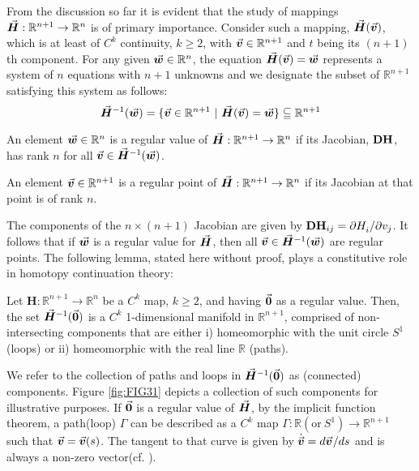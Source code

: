 From the discussion so far it is evident that the study of mappings
$\vec{\bm{H}}:\mathbb{R}^{n+1}\rightarrow\mathbb{R}^n$ is of primary importance. 
Consider such a mapping, $\vec{\bm{H}}(\vec{\bm{v}})$, which is at least 
of $C^k$ continuity, $k\geq 2$, with $\vec{\bm{v}}\in\mathbb{R}^{n+1}$ and $t$ 
being its $(n+1)$th component. 
For any given $\vec{\bm{w}}\in\mathbb{R}^n$, the equation 
$\vec{\bm{H}}(\vec{\bm{v}})=\vec{\bm{w}}$
represents a system of $n$ equations with $n+1$ unknowns and we designate the
subset of $\mathbb{R}^{n+1}$ satisfying this system as follows:
\begin{equation*}
	\bvec{H}^{-1}(\bvec{w}) = \{\bvec{v}\in\mathbb{R}^{n+1}\ |\ 
	\bvec{H}(\bvec{v})=\bvec{w}\}\subseteqq\mathbb{R}^{n+1}
\end{equation*}
\begin{definition}
	An element $\vec{\bm{w}}\in\mathbb{R}^n$ is a regular value of 
	$\vec{\bm{H}}:\mathbb{R}^{n+1}\rightarrow\mathbb{R}^n$ if its Jacobian,
	$\mathbf{DH}$, has rank $n$ for all $\vec{\bm{v}}\in \vec{\bm{H}}^{-1}(\vec{\bm{w}})$.
	\label{def:reg}
\end{definition}
\begin{definition}
	An element $\vec{\bm{v}}\in\mathbb{R}^{n+1}$ is a regular point of
	$\vec{\bm{H}}:\mathbb{R}^{n+1}\rightarrow\mathbb{R}^n$ if its Jacobian at that 
	point is of rank $n$.
	\label{def:reqpoint}
\end{definition}
The components of the $n\times (n+1)$ Jacobian are given by $\mathbf{DH}_{ij} = 
\partial H_i^{}/\partial v_j$. It follows that if $\vec{\bm{w}}$ is a regular value 
for $\vec{\bm{H}}$, then all $\vec{\bm{v}}\in\vec{\bm{H}}^{-1}(\vec{\bm{w}})$ are regular 
points. The following lemma\cite{Allgower:2003}, stated 
here without proof, plays a constitutive role in homotopy continuation theory:

\begin{lemma}
	Let $\bm{H}:\mathbb{R}^{n+1}\rightarrow\mathbb{R}^n$ be a $C^k$ map, $k\geq
	2$, and having $\vec{\bm{0}}$ as a regular value. Then, the set 
	$\vec{\bm{H}}^{-1}(\vec{\bm{0}})$ 
	is a $C^k$ 1-dimensional manifold in $\mathbb{R}^{n+1}$, comprised of
	non-intersecting components
	that are either i) homeomorphic with the unit circle $S^1$ (loops) or 
	ii) homeomorphic with the real line $\mathbb{R}$ (paths).
	\label{Lemma:manifold}
\end{lemma}
We refer to the collection of paths and loops in $\vec{\bm{H}}^{-1}(\vec{\bm{0}})$ as
(connected) components. Figure \ref{fig:FIG31} depicts a collection of such 
components for illustrative purposes. If $\vec{\bm{0}}$ is a regular value of 
$\vec{\bm{H}}$, by the
implicit function theorem, a path(loop) $\mathit{\Gamma}$ can be described as a
$C^k$ 
map $\mathit{\Gamma}:\mathbb{R}(\text{or}\ S^1)\rightarrow\mathbb{R}^{n+1}$ 
such that
$\vec{\bm{v}}=\vec{\bm{v}}(s)$. The tangent to that curve is given by
$\dot{\vec{\bm{v}}}=d\vec{\bm{v}}^{}/ds$ and is always a non-zero vector(cf.
\cite{Allgower:2003,Garcia:1980}).

